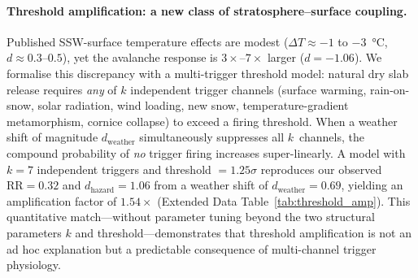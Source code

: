 \documentclass[11pt,letterpaper]{article}
\begin{document}
\paragraph{Threshold amplification: a new class of stratosphere--surface coupling.} Published SSW-surface temperature effects are modest ($\Delta T \approx -1$ to $-3$~°C, $d \approx 0.3$--$0.5$)\cite{Kolstad2010,Butler2017}, yet the avalanche response is $3\times$--$7\times$ larger ($d = -1.06$). We formalise this discrepancy with a multi-trigger threshold model: natural dry slab release requires \emph{any} of $k$ independent trigger channels (surface warming, rain-on-snow, solar radiation, wind loading, new snow, temperature-gradient metamorphism, cornice collapse) to exceed a firing threshold. When a weather shift of magnitude $d_{\mathrm{weather}}$ simultaneously suppresses all $k$~channels, the compound probability of \emph{no} trigger firing increases super-linearly. A model with $k = 7$ independent triggers and threshold $= 1.25\sigma$ reproduces our observed $\mathrm{RR} = 0.32$ and $d_{\mathrm{hazard}} = 1.06$ from a weather shift of $d_{\mathrm{weather}} = 0.69$, yielding an amplification factor of $1.54\times$ (Extended Data Table~\ref{tab:threshold_amp}). This quantitative match---without parameter tuning beyond the two structural parameters $k$ and threshold---demonstrates that threshold amplification is not an ad hoc explanation but a predictable consequence of multi-channel trigger physiology.
\end{document}
